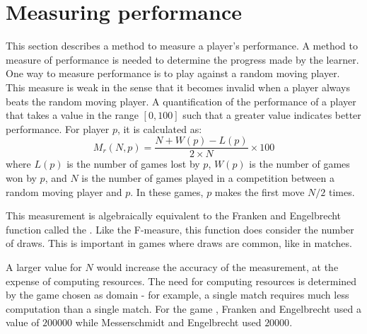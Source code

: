 \section{Measuring performance}
\label{sec:learning-performance}
This section describes a method to measure a player's performance. A method to measure of performance is needed to determine the progress made by the learner.  One way to measure performance is to play against a random moving player.  This measure is weak in the sense that it becomes invalid when a player always beats the random moving player.    
 {A quantification of the performance of a player that takes a value in the range $[0,100]$ such that a greater value indicates better performance.  For player $p$, it is calculated as:
\begin{equation}
	M_r(N,p) =  \frac{N + W(p) - L(p)}{2 \times N} \times 100
	\label{eq:performance}
\end{equation}
where $L(p)$ is the number of games lost by $p$, $W(p)$ is the number of games won by $p$, and $N$ is the number of games played in a competition between a random moving player and $p$.  In these games, $p$ makes the first move $N/2$ times.
}

This measurement is algebraically equivalent to the Franken and Engelbrecht \cite{franken:checkers} function called the .  Like the F-measure, this function does consider the number of draws. This is important in games where draws are common, like in  matches. 

A larger value for $N$ would increase the accuracy of the measurement, at the expense of computing resources. The need for computing resources is determined by the game chosen as domain - for example, a single  match requires much less computation than a single  match. For the game , Franken and Engelbrecht \cite{franken:checkers} used a value of $200000$ while Messerschmidt and Engelbrecht \cite{messerschmidt:learning} used $20000$.      

